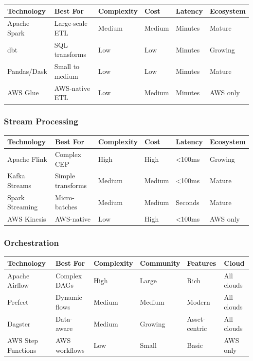 \begin{tabular}{|p{2.5cm}|p{2cm}|p{2cm}|p{2cm}|p{2cm}|p{2cm}|}
\hline
\textbf{Technology} & \textbf{Best For} & \textbf{Complexity} & \textbf{Cost} & \textbf{Latency} & \textbf{Ecosystem} \\
\hline
Apache Spark & Large-scale ETL & Medium & Medium & Minutes & Mature \\
\hline
dbt & SQL transforms & Low & Low & Minutes & Growing \\
\hline
Pandas/Dask & Small to medium & Low & Low & Minutes & Mature \\
\hline
AWS Glue & AWS-native ETL & Low & Medium & Minutes & AWS only \\
\hline
\end{tabular}

\subsubsection{Stream Processing}

\begin{tabular}{|p{2.5cm}|p{2cm}|p{2cm}|p{2cm}|p{2cm}|p{2cm}|}
\hline
\textbf{Technology} & \textbf{Best For} & \textbf{Complexity} & \textbf{Cost} & \textbf{Latency} & \textbf{Ecosystem} \\
\hline
Apache Flink & Complex CEP & High & High & <100ms & Growing \\
\hline
Kafka Streams & Simple transforms & Medium & Medium & <100ms & Mature \\
\hline
Spark Streaming & Micro-batches & Medium & Medium & Seconds & Mature \\
\hline
AWS Kinesis & AWS-native & Low & High & <100ms & AWS only \\
\hline
\end{tabular}

\subsubsection{Orchestration}

\begin{tabular}{|p{2.5cm}|p{2cm}|p{2cm}|p{2cm}|p{2cm}|p{2cm}|}
\hline
\textbf{Technology} & \textbf{Best For} & \textbf{Complexity} & \textbf{Community} & \textbf{Features} & \textbf{Cloud} \\
\hline
Apache Airflow & Complex DAGs & High & Large & Rich & All clouds \\
\hline
Prefect & Dynamic flows & Medium & Medium & Modern & All clouds \\
\hline
Dagster & Data-aware & Medium & Growing & Asset-centric & All clouds \\
\hline
AWS Step Functions & AWS workflows & Low & Small & Basic & AWS only \\
\hline
\end{tabular}


